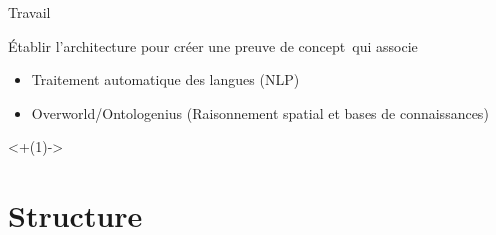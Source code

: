\documentclass[aspectratio=169]{audition-beamer}
\begin{document}
\begin{frame}{Travail}

  \vfill
  Établir l'architecture pour créer une preuve de concept\pause\ qui associe
  \begin{itemize}
    \item Traitement automatique des langues (NLP)
    \item Overworld/Ontologenius (Raisonnement spatial et bases de connaissances)
  \end{itemize}


  \onslide<+(1)->{\tableofcontents[subsectionstyle=hide/hide/hide]}

\end{frame}

\section{Structure}
\end{document}
